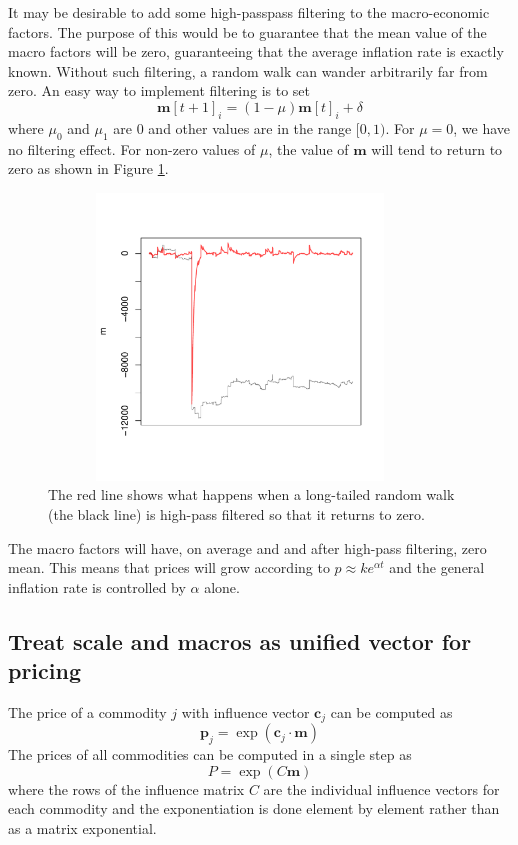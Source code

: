 \documentclass[11pt]{article}
\begin{document}
It may be desirable to add some high-passpass filtering to the macro-economic factors. The purpose of this would be to guarantee that the mean value of the macro factors will be zero, guaranteeing that the average inflation rate is exactly known. Without such filtering, a random walk can wander arbitrarily far from zero. An easy way to implement filtering is to set
\[
\mathbf m[t+1]_i = (1-\mu) \mathbf m[t]_i + \delta
\]
where $\mu_0$ and $\mu_1$ are $0$ and other values are in the range $[0,1)$. For $\mu =0$, we have no filtering effect. For non-zero values of $\mu$, the value of $\mathbf m$ will tend to return to zero as shown in Figure \ref{filtered-random-walk}.
\begin{figure}[htbp]
\begin{center}
\includegraphics[width=4in, height=3in]{filtered-step.pdf}
\caption{The red line shows what happens when a long-tailed random walk (the black line) is high-pass filtered so that it returns to zero.}
\label{filtered-random-walk}
\end{center}
\end{figure}
The macro factors will have, on average and and after high-pass filtering, zero mean. This means that prices will grow according to $p \approx k e^{\alpha t}$ and the general inflation rate is controlled by $\alpha$ alone. 

\subsection{Treat scale and macros as unified vector for pricing}
The price of a commodity $j$ with influence vector $\mathbf c_j$ can be computed as
\[
\mathbf p_j = \exp (\mathbf c_j \cdot \mathbf m)
\]
The prices of all commodities can be computed in a single step as
\[
 P = \exp ( C \mathbf m)
\]
where the rows of the influence matrix $ C$ are the individual influence vectors for each commodity and the exponentiation is done element by element rather than as a matrix exponential.
\end{document}
